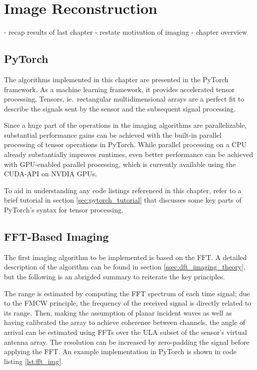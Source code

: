 \chapter{Image Reconstruction}
- recap results of last chapter
- restate motivation of imaging
- chapter overview

\section{PyTorch}
The algorithms implemented in this chapter are presented in the PyTorch framework.
As a machine learning framework, it provides accelerated tensor processing.
Tensors, ie.\ rectangular multidimensional arrays are a perfect fit to
describe the signals sent by the sensor and the subsequent signal processing.

Since a huge part of the operations in the imaging algorithms are parallelizable,
substantial performance gains can be achieved with the built-in parallel processing
of tensor operations in PyTorch.
While parallel processing on a CPU already substantially improves runtimes,
even better performance can be achieved with GPU-enabled parallel processing,
which is currently available using the CUDA-API on NVDIA GPUs.

To aid in understanding any code listings referenced in this chapter,
refer to a brief tutorial in section \ref{sec:pytorch_tutorial}
that discusses some key parts of PyTorch's syntax for tensor processing.

\section{FFT-Based Imaging}

The first imaging algorithm to be implemented is based on the FFT.
A detailed description of the algorithm can be found in section \ref{ssec:dft_imaging_theory},
but the following is an abrigded summary to reiterate the key principles.

The range is estimated by computing the FFT spectrum of each time signal;
due to the FMCW principle, the frequency of the received signal is directly related to its range.
Then, making the assumption of planar incident waves
as well as having calibrated the array to achieve coherence between channels,
the angle of arrival can be estimated using FFTs over the ULA subset of the sensor's virtual antenna array.
The resolution can be increased by zero-padding the signal before applying the FFT.
An example implementation in PyTorch is shown in code listing \ref{lst:fft_img}.

